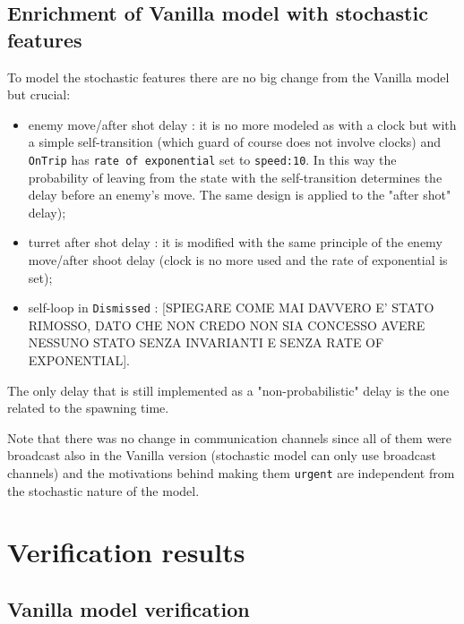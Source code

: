\documentclass[
10pt, %
a4paper, %
oneside, %
headinclude,footinclude, %
BCOR5mm, %
]{scrartcl}
\begin{document}
		\subsection{Enrichment of Vanilla model with stochastic features}
			To model the stochastic features there are no big change from the Vanilla model but crucial:
			\begin{itemize}
				\item enemy move/after shot delay : it is no more modeled as with a clock but with a simple self-transition (which guard of course does not involve clocks) and \texttt{OnTrip} has \texttt{rate of exponential} set to \texttt{speed:10}. In this way the probability of leaving from the state with the self-transition determines the delay before an enemy's move. The same design is applied to the "after shot" delay);
				\item turret after shot delay : it is modified with the same principle of the enemy move/after shoot delay (clock is no more used and the rate of exponential is set);
				\item self-loop in \texttt{Dismissed} : [SPIEGARE COME MAI DAVVERO E' STATO RIMOSSO, DATO CHE NON CREDO NON SIA CONCESSO AVERE NESSUNO STATO SENZA INVARIANTI E SENZA RATE OF EXPONENTIAL].
			\end{itemize}
			The only delay that is still implemented as a "non-probabilistic" delay is the one related to the spawning time.
			
			Note that there was no change in communication channels since all of them were broadcast also in the Vanilla version (stochastic model can only use broadcast channels) and the motivations behind making them \texttt{urgent} are independent from the stochastic nature of the model.
	\newpage
	\section{Verification results}
		\subsection{Vanilla model verification}
\end{document}
